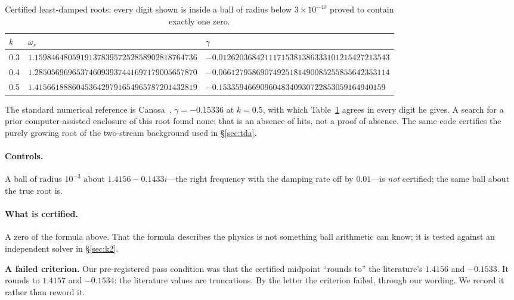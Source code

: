 \documentclass[11pt,a4paper]{article}
\begin{document}
\begin{table}[h]\centering\small
\begin{tabular}{@{}lll@{}}
\toprule
$k$ & $\omega_r$ & $\gamma$ \\
\midrule
0.3 & $1.159846480591913783957252858902818764736$ & $-0.01262036842111715381386333101215427213543$\\
0.4 & $1.285056969653746093937441697179005657870$ & $-0.06612795869074925181490085255855642353114$\\
0.5 & $1.415661888604536429791654965787201432819$ & $-0.1533594669096048340930722853059164940159$\\
\bottomrule
\end{tabular}
\caption{Certified least-damped roots; every digit shown is inside a ball of radius below $3\times10^{-40}$
proved to contain exactly one zero.}
\label{tab:roots}
\end{table}

The standard numerical reference is Canosa~\cite{Canosa1973}, $\gamma=-0.15336$ at $k=0.5$, with which
Table~\ref{tab:roots} agrees in every digit he gives. A search for a prior computer-assisted enclosure of
this root found none; that is an absence of hits, not a proof of absence. The same code certifies the
purely growing root of the two-stream background used in \S\ref{sec:tda}.

\paragraph{Controls.} A ball of radius $10^{-3}$ about $1.4156-0.1433i$---the right frequency with the
damping rate off by $0.01$---is \emph{not} certified; the same ball about the true root is.

\paragraph{What is certified.} A zero of the formula above. That the formula describes the physics is
not something ball arithmetic can know; it is tested against an independent solver in
\S\ref{sec:k2}.

\begin{failbox}
\textbf{A failed criterion.} Our pre-registered pass condition was that the certified midpoint ``rounds
to'' the literature's $1.4156$ and $-0.1533$. It rounds to $1.4157$ and $-0.1534$: the literature values
are truncations. By the letter the criterion failed, through our wording. We record it rather than
reword it.
\end{failbox}
\end{document}
